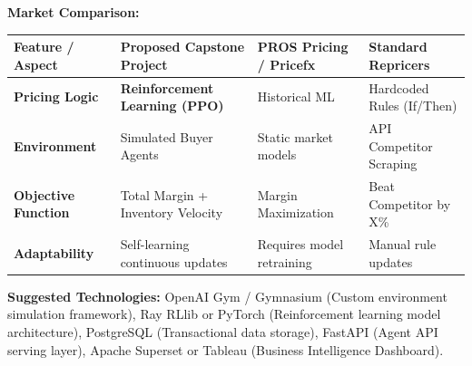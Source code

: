 \documentclass[11pt, a4paper]{article}
\begin{document}
\vspace{0.4cm}
\noindent\textbf{Market Comparison:}

\vspace{0.2cm}
\noindent\renewcommand{\arraystretch}{1.5}
\begin{tabular}{|p{3.5cm}|p{4.5cm}|p{3.8cm}|p{3.8cm}|}
\hline
\textbf{Feature / Aspect} & \textbf{Proposed Capstone Project} & \textbf{PROS Pricing / Pricefx} & \textbf{Standard Repricers} \\
\hline
\textbf{Pricing Logic} & \textbf{Reinforcement Learning (PPO)} & Historical ML & Hardcoded Rules (If/Then) \\
\hline
\textbf{Environment} & Simulated Buyer Agents & Static market models & API Competitor Scraping \\
\hline
\textbf{Objective Function} & Total Margin + Inventory Velocity & Margin Maximization & Beat Competitor by X\% \\
\hline
\textbf{Adaptability} & Self-learning continuous updates & Requires model retraining & Manual rule updates \\
\hline
\end{tabular}

\vspace{0.4cm}
\noindent\textbf{Suggested Technologies:} OpenAI Gym / Gymnasium (Custom environment simulation framework), Ray RLlib or PyTorch (Reinforcement learning model architecture), PostgreSQL (Transactional data storage), FastAPI (Agent API serving layer), Apache Superset or Tableau (Business Intelligence Dashboard).
\end{document}
